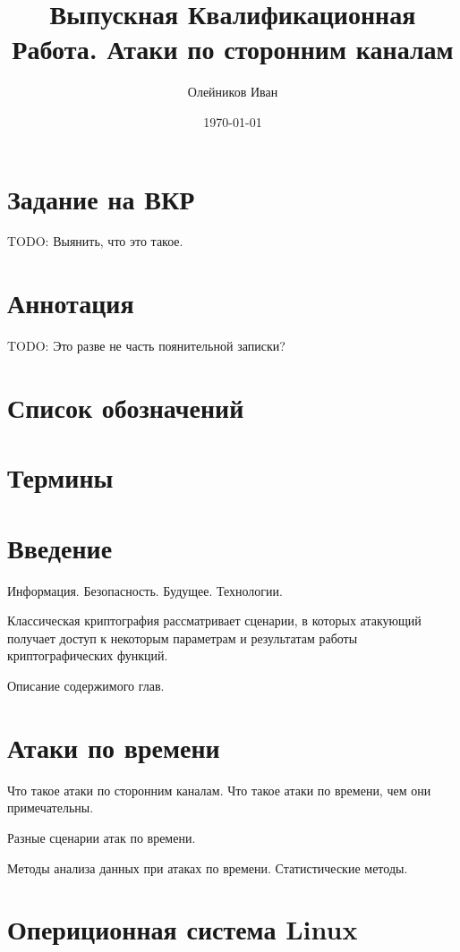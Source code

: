 \documentclass[11pt,twoside,a4paper]{report}
\begin{document}
\title{Выпускная Квалификационная Работа. Атаки по сторонним каналам}
\author{Олейников Иван}
\date{\today}
\maketitle

\tableofcontents

\chapter*{Задание на ВКР}

TODO: Выянить, что это такое.

\chapter*{Аннотация}

TODO: Это разве не часть поянительной записки?

\chapter*{Список обозначений}

\chapter*{Термины}

\chapter*{Введение}

Информация. Безопасность. Будущее. Технологии.

Классическая криптография рассматривает сценарии, в которых атакующий получает доступ к некоторым параметрам и результатам работы криптографических функций.

Описание содержимого глав.

\chapter{Атаки по времени}

Что такое атаки по сторонним каналам. Что такое атаки по времени, чем они примечательны.

Разные сценарии атак по времени.

Методы анализа данных при атаках по времени. Статистические методы.

\chapter{Опериционная система Linux}
\end{document}
